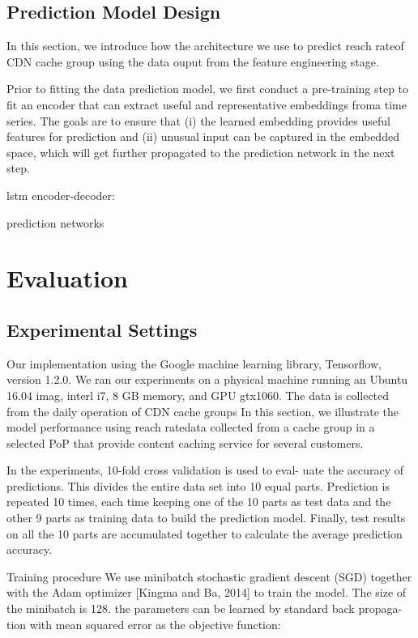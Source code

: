 \documentclass[5p]{elsarticle}
\newcommand{\dabiaolv}{reach rate}
\begin{document}
\subsection{Prediction Model Design}

In this section, we introduce how the architecture we use to predict \dabiaolv of CDN cache group using the data ouput from the feature engineering stage. 

Prior to fitting the data prediction model, we first conduct a pre-training step to fit an encoder that can extract useful and representative embeddings froma  time  series.  The  goals  are  to  ensure  that  (i)  the  learned embedding  provides  useful  features  for  prediction  and  (ii) unusual input can be captured in the embedded space, which will get further propagated to the prediction network in the next step.


lstm encoder-decoder:

prediction networks

\section{Evaluation}
\subsection{Experimental Settings}
Our implementation using the Google machine learning library, Tensorflow, version 1.2.0. We ran our experiments on a physical machine running an Ubuntu 16.04 imag, interl i7, 8 GB memory, and GPU gtx1060.
The data is collected from the daily operation of CDN cache groups
In this section, we illustrate the model performance using \dabiaolv data collected from a cache group in a selected PoP that provide content caching service for several customers. 

In the experiments, 10-fold cross validation is used to eval-
uate the accuracy of predictions. This divides the entire data
set into 10 equal parts.  Prediction is repeated 10 times, each
time keeping one of the 10 parts as test data and the other 9
parts as training data to build the prediction model. Finally,
test results on all the 10 parts are accumulated together to
calculate the average prediction accuracy.

Training procedure We use minibatch stochastic gradient descent (SGD) together with the Adam optimizer [Kingma and Ba, 2014] to train the model. The size of the minibatch is 128. the parameters can be learned by standard back propaga- tion with mean squared error as the objective function:
\end{document}
